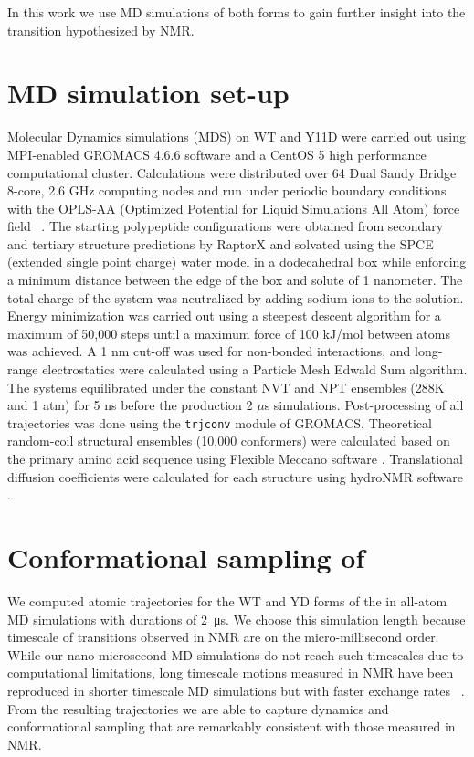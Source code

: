 In this work we use MD simulations of both \gct forms to gain further insight into the transition hypothesized by NMR.  

\section{MD simulation set-up}

Molecular Dynamics simulations (MDS) on WT and Y11D \gct were carried out using MPI-enabled GROMACS 4.6.6 software\cite{hess2008gromacs} and a CentOS 5 high performance computational cluster. Calculations were distributed over 64 Dual Sandy Bridge 8-core, 2.6 GHz computing nodes and run under periodic boundary conditions with the OPLS-AA (Optimized Potential for Liquid Simulations All Atom) force field ~\cite{kaminski2001evaluation}.  The starting \gct polypeptide configurations were obtained from secondary and tertiary structure predictions by RaptorX \cite{kallberg2012template} and solvated using the SPCE (extended single point charge) water model in a dodecahedral box while enforcing a minimum distance between the edge of the box and solute of 1 nanometer. The total charge of the system was neutralized by adding sodium ions to the solution. Energy minimization was carried out using a steepest descent algorithm for a maximum of 50,000 steps until a maximum force of 100 kJ/mol between atoms was achieved. A 1 nm cut-off was used for non-bonded interactions, and long-range electrostatics were calculated using a Particle Mesh Edwald Sum algorithm. The systems equilibrated under the constant NVT and NPT ensembles (288K and 1 atm) for 5 ns before the production 2 $\mu$s simulations. Post-processing of all trajectories was done using the \texttt{trjconv} module of GROMACS. Theoretical random-coil structural ensembles (10,000 conformers) were calculated based on the \gct primary amino acid sequence using Flexible Meccano software \cite{ozenne2012flexible}. Translational diffusion coefficients were calculated for each structure using hydroNMR software \cite{de2000hydronmr}. 


\section{Conformational sampling of \gct}

We computed atomic trajectories for the WT and YD forms of the \gct in all-atom MD simulations with durations of \SI{2}{\us}. We choose this simulation length because timescale of transitions observed in NMR are on the micro-millisecond order. While our nano-microsecond MD simulations do not reach such timescales due to computational limitations, long timescale motions measured in NMR have been reproduced in shorter timescale MD simulations but with faster exchange rates ~\cite{massi2004nmr, stafford2015conformational, henzler2007dynamic}. From the resulting trajectories we are able to capture dynamics and conformational sampling that are remarkably consistent with those measured in NMR.\\

